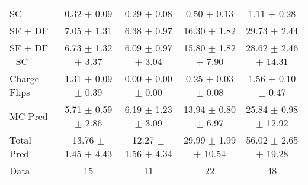 \begin{tabular}{l|cccc}
                                 SC &  0.32 $\pm$  0.09 &  0.29 $\pm$  0.08 &  0.50 $\pm$  0.13 &  1.11 $\pm$  0.28 \\
                            SF + DF &  7.05 $\pm$  1.31 &  6.38 $\pm$  0.97 & 16.30 $\pm$  1.82 & 29.73 $\pm$  2.44 \\
\hline
                       SF + DF - SC &  6.73 $\pm$  1.32 $\pm$  3.37 &  6.09 $\pm$  0.97 $\pm$  3.04 & 15.80 $\pm$  1.82 $\pm$  7.90 & 28.62 $\pm$  2.46 $\pm$ 14.31 \\
\hline\hline
                       Charge Flips &  1.31 $\pm$  0.09 $\pm$  0.39 &  0.00 $\pm$  0.00 $\pm$  0.00 &  0.25 $\pm$  0.03 $\pm$  0.08 &  1.56 $\pm$  0.10 $\pm$  0.47 \\
\hline
                            MC Pred &  5.71 $\pm$  0.59 $\pm$  2.86 &  6.19 $\pm$  1.23 $\pm$  3.09 & 13.94 $\pm$  0.80 $\pm$  6.97 & 25.84 $\pm$  0.98 $\pm$ 12.92 \\
\hline
                         Total Pred & 13.76 $\pm$  1.45 $\pm$  4.43 & 12.27 $\pm$  1.56 $\pm$  4.34 & 29.99 $\pm$  1.99 $\pm$ 10.54 & 56.02 $\pm$  2.65 $\pm$ 19.28 \\
\hline\hline
                               Data &    15 &    11 &    22 &    48 \\
\hline\hline
\end{tabular}

